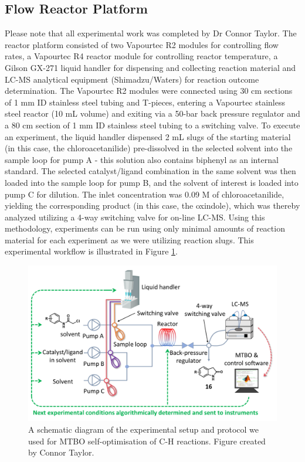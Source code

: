 \subsection{Flow Reactor Platform}

Please note that all experimental work was completed by Dr Connor Taylor. The reactor platform consisted of two Vapourtec R2 modules for controlling flow rates, a Vapourtec R4 reactor module for controlling reactor temperature, a Gilson GX-271 liquid handler for dispensing and collecting reaction material and LC-MS analytical equipment (Shimadzu/Waters) for reaction outcome determination. The Vapourtec R2 modules were connected using 30 cm sections of 1 mm ID stainless steel tubing and T-pieces, entering a Vapourtec stainless steel reactor (10 mL volume) and exiting via a 50-bar back pressure regulator and a 80 cm section of 1 mm ID stainless steel tubing to a switching valve. To execute an experiment, the liquid handler dispensed 2 mL slugs of the starting material (in this case, the chloroacetanilide) pre-dissolved in the selected solvent into the sample loop for pump A - this solution also contains biphenyl as an internal standard. The selected catalyst/ligand combination in the same solvent was then loaded into the sample loop for pump B, and the solvent of interest is loaded into pump C for dilution. The inlet concentration was 0.09 M of chloroacetanilide, yielding the corresponding product (in this case, the oxindole), which was thereby analyzed utilizing a 4-way switching valve for on-line LC-MS. Using this methodology, experiments can be run using only minimal amounts of reaction material for each experiment as we were utilizing reaction slugs. This experimental workflow is illustrated in Figure \ref{fig:self_opt_setup}.

\begin{figure}
    \centering
    \includegraphics{gfx/Chapter04/self_optimization_setup.png}
    \caption{A schematic diagram of the experimental setup and protocol we used for MTBO self-optimisation of C-H reactions. Figure created by Connor Taylor.}
    \label{fig:self_opt_setup}
\end{figure}

